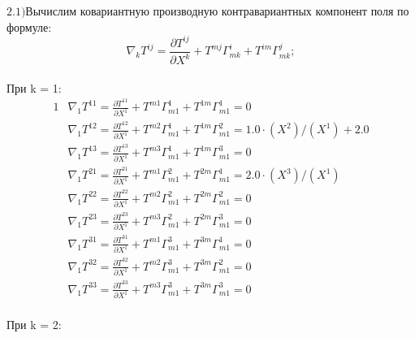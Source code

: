 \documentclass[a4paper, 12pt, oneside]{article}
\begin{document}
$\mathrm{2.1) }$Вычислим ковариантную производную контравариантных компонент поля по формуле:\\
\[
\nabla_kT^{ij} = \frac{\partial T^{ij}}{\partial X^k} + T^{mj}\Gamma^i_{mk} + T^{im}\Gamma^j_{mk};
\]\\
При k = 1:\\
\begin{alignat*}{1}
  & \nabla_1T^{11} = \frac{\partial T^{11}}{\partial X^1} + T^{m1}\Gamma^1_{m1} + T^{1m}\Gamma^1_{m1} = 0 \\
  & \nabla_1T^{12} = \frac{\partial T^{12}}{\partial X^1} + T^{m2}\Gamma^1_{m1} + T^{1m}\Gamma^2_{m1} = 1.0\cdot (X^2)/(X^1) + 2.0 \\
  & \nabla_1T^{13} = \frac{\partial T^{13}}{\partial X^1} + T^{m3}\Gamma^1_{m1} + T^{1m}\Gamma^3_{m1} = 0 \\
  & \nabla_1T^{21} = \frac{\partial T^{21}}{\partial X^1} + T^{m1}\Gamma^2_{m1} + T^{2m}\Gamma^1_{m1} = 2.0\cdot (X^3)/(X^1) \\
  & \nabla_1T^{22} = \frac{\partial T^{22}}{\partial X^1} + T^{m2}\Gamma^2_{m1} + T^{2m}\Gamma^2_{m1} = 0 \\
  & \nabla_1T^{23} = \frac{\partial T^{23}}{\partial X^1} + T^{m3}\Gamma^2_{m1} + T^{2m}\Gamma^3_{m1} = 0 \\
  & \nabla_1T^{31} = \frac{\partial T^{31}}{\partial X^1} + T^{m1}\Gamma^3_{m1} + T^{3m}\Gamma^1_{m1} = 0 \\
  & \nabla_1T^{32} = \frac{\partial T^{32}}{\partial X^1} + T^{m2}\Gamma^3_{m1} + T^{3m}\Gamma^2_{m1} = 0 \\
  & \nabla_1T^{33} = \frac{\partial T^{33}}{\partial X^1} + T^{m3}\Gamma^3_{m1} + T^{3m}\Gamma^3_{m1} = 0 
\end{alignat*}\\
При k = 2:\\
\end{document}
